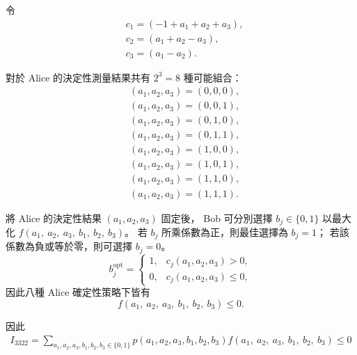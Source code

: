 \documentclass[12pt, a4paper, twoside, reqno]{article}
\begin{document}
\noindent 令
\[
    \begin{aligned}
    &c_1 = (-1+a_1+a_2+a_3),\\
    &c_2 = (a_1+a_2-a_3),\\
    &c_3 = (a_1-a_2).
    \end{aligned}
\]

\noindent 對於 Alice 的決定性測量結果共有 $2^3=8$ 種可能組合：
\begin{equation*}
\begin{aligned}
    &(a_1,a_2,a_3)=(0,0,0),\\
    &(a_1,a_2,a_3)=(0,0,1),\\
    &(a_1,a_2,a_3)=(0,1,0),\\
    &(a_1,a_2,a_3)=(0,1,1),\\
    &(a_1,a_2,a_3)=(1,0,0),\\
    &(a_1,a_2,a_3)=(1,0,1),\\
    &(a_1,a_2,a_3)=(1,1,0),\\
    &(a_1,a_2,a_3)=(1,1,1).
\end{aligned}
\end{equation*}

\indent 將 Alice 的決定性結果 $(a_1,a_2,a_3)$ 固定後，
Bob 可分別選擇 $b_j\in\{0,1\}$ 以最大化 $f(a_1,~a_2,~a_3,~b_1,~b_2,~b_3)$。
若 $b_j$ 所乘係數為正，則最佳選擇為 $b_j=1$；
若該係數為負或等於零，則可選擇 $b_j=0$。
\begin{equation}
    b_j^{\mathrm{opt}}
    =
    \begin{cases}
        1, & c_j(a_1,a_2,a_3)>0,\\
        0, & c_j(a_1,a_2,a_3)\leq 0,
    \end{cases}
\end{equation}
\noindent 因此八種 Alice 確定性策略下皆有
\[
    f(a_1,~a_2,~a_3,~b_1,~b_2,~b_3) \leq 0.
\]

\noindent 因此
\begin{equation}
    \begin{aligned}
        I_{3322} = \sum_{a_1,a_2,a_3,b_1,b_2,b_3 \in\{0,1\}} p(a_1,a_2,a_3,b_1,b_2,b_3) f(a_1,~a_2,~a_3,~b_1,~b_2,~b_3)\leq0
    \end{aligned}
\end{equation}
\end{document}
